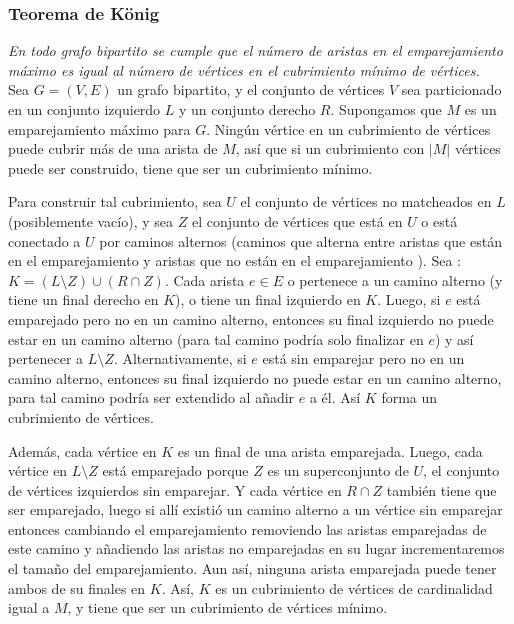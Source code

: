 \documentclass[12pt,a4paper]{report}
\begin{document}
\subsubsection{\cite{konigTeorema}Teorema de König}\label{D1}
\textit{En todo grafo bipartito se cumple que el número de aristas en el emparejamiento máximo es igual al número de vértices en el cubrimiento mínimo de vértices.}\\
\newline
Sea $G=(V,E)$ un grafo bipartito, y el conjunto de vértices $V$ sea particionado en un conjunto izquierdo $ L$ y un conjunto derecho $R$. Supongamos que $M$ es un emparejamiento máximo para $G$.
Ningún vértice en un cubrimiento de vértices puede cubrir más de una arista de $M$, así que si un cubrimiento con $|M|$ vértices puede ser construido, tiene que ser un cubrimiento mínimo.\\\newline

Para construir tal cubrimiento, sea $U$ el conjunto de vértices no matcheados en $L$(posiblemente vacío), y sea $Z$ el conjunto de vértices que está en $U$ o está conectado a $U$
por caminos alternos (caminos que alterna entre aristas que están en el emparejamiento y aristas que no están en el emparejamiento ). Sea
: $K=(L\setminus Z)\cup (R\cap Z)$.
Cada arista $e \in E$ o pertenece a un camino alterno (y tiene un final derecho en $K$), o tiene un final izquierdo en $K$. Luego, si $e$ está emparejado pero no en un camino alterno, entonces su final izquierdo no puede estar en un camino alterno (para tal camino podría solo finalizar en $e$) y así pertenecer a $L\setminus Z$. Alternativamente, si $e$ est\'a sin emparejar pero no en un camino alterno, entonces su final izquierdo no puede estar en un camino alterno, para tal camino podría ser extendido al añadir $e$ a él. Así $K$ forma un cubrimiento de vértices.\\\newline

Además, cada vértice en $K$
es un final de una arista emparejada. Luego, cada vértice en $L\setminus Z$
está emparejado porque $Z$ es un superconjunto de $U$, el conjunto de vértices izquierdos sin emparejar. Y cada vértice en $R\cap Z$  también tiene que ser emparejado, luego si allí existió un camino alterno a un vértice sin emparejar entonces cambiando el emparejamiento removiendo las aristas emparejadas de este camino y añadiendo las aristas no emparejadas en su lugar incrementaremos el tamaño del emparejamiento. Aun así, ninguna arista emparejada puede tener ambos de su finales en $K$. Así, $K$ es un cubrimiento de vértices de cardinalidad igual a $M$, y tiene que ser un cubrimiento de vértices mínimo.
\end{document}
